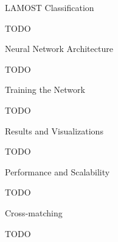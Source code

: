 \chap LAMOST Classification

TODO

\sec Neural Network Architecture

TODO

\sec Training the Network

TODO

\sec Results and Visualizations

TODO

\sec Performance and Scalability

TODO

\sec Cross-matching

TODO
